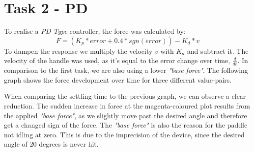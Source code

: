   \section*{Task 2 - PD}

  To realise a \textit{PD-Type} controller, the force was calculated by:
  \begin{equation*}
    F = (K_p * error + 0.4 * sgn(error)) - K_d * v
  \end{equation*}
  To dampen the response we multiply the velocity $v$ with $K_d$ and subtract it. The velocity of the handle was used, as it's equal to the error change over time, $\frac{d}{dt}$. In comparison to the first task, we are also using a lower \textit{"base force"}. The following graph shows the force development over time for three different value-pairs.

  \begin{figure}[H]
    \centering
  \end{figure}

  When comparing the settling-time to the previous graph, we can observe a clear reduction. The sudden increase in force at the magenta-coloured plot results from the applied \textit{"base force"}, as we slightly move past the desired angle and therefore get a changed sign of the force. The \textit{"base force"} is also the reason for the paddle not idling at zero. This is due to the imprecision of the device, since the desired angle of 20 degrees is never hit.

